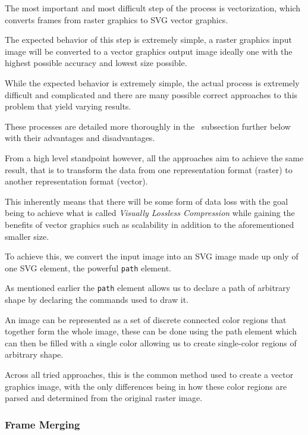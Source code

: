 \documentclass[12pt]{article}
\newcommand{\sentence}{} %
\newcommand{\italic}[1]{\textit{#1}}
\begin{document}
    \tab
    The most important and most difficult step of the process is vectorization, which converts
    frames from raster graphics to SVG vector graphics.
    \sentence
    The expected behavior of this step is extremely simple, a raster graphics input image will be converted to a
    vector graphics output image ideally one with the highest possible accuracy and lowest size possible.
    \sentence
    While the expected behavior is extremely simple, the actual process is extremely difficult and complicated and
    there are many possible correct approaches to this problem that yield varying results.
    \sentence
    These processes are detailed more thoroughly in the~ subsection further below
    with their advantages and disadvantages.
    \sentence
    From a high level standpoint however, all the approaches aim to achieve the same result, that is to transform the
    data from one representation format (raster) to another representation format (vector).
    \sentence
    This inherently means that there will be some form of data loss with the goal being to achieve what is called
    \italic{Visually Lossless Compression} while gaining the benefits of vector graphics such as scalability in
    addition to the aforementioned smaller size.
    \sentence
    To achieve this, we convert the input image into an SVG image made up only of one SVG element, the powerful
    \verb|path| element.
    \sentence
    As mentioned earlier the \verb|path| element allows us to declare a path of arbitrary shape by declaring the
    commands used to draw it.
    \sentence
    An image can be represented as a set of discrete connected color regions that together form the whole image,
    these can be done using the path element which can then be filled with a single color allowing us to create
    single-color regions of arbitrary shape.
    \sentence
    Across all tried approaches, this is the common method used to create a vector graphics image, with the only
    differences being in how these color regions are parsed and determined from the original raster image.


    \subsubsection{Frame Merging}\label{subsubsec:frame-merging}
\end{document}

